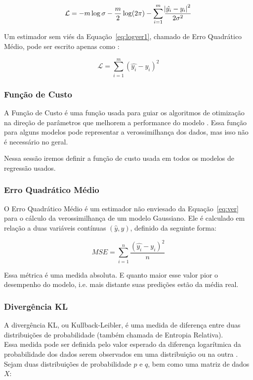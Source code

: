 \begin{equation}
\label{eq:logver1}
  \mathcal{L}= -m \log \sigma - \frac{m}{2} \log (2 \pi) - \sum^m_{i=1}
  \frac{\abs{\hat{y_i}-y_i}^2}{2 \sigma^2}
\end{equation}

Um estimador sem viés da Equação~\ref{eq:logver1}, chamado de Erro Quadrático
Médio, pode ser escrito apenas como \citep{mlprob}:

\begin{equation}
  \label{eq:logver2}
  \mathcal{L}=  \sum^m_{i=1} (\hat{y_i}-y_i)^2
\end{equation}


\subsubsection{Função de Custo}

A Função de Custo é uma função usada para guiar os algoritmos de otimização na
direção de parâmetros que melhorem a performance do modelo \citep{dlbook}.
Essa função para alguns modelos pode representar a verossimilhança dos dados,
mas isso não é necessário no geral.

Nessa sessão iremos definir a função de custo usada em todos os modelos de regressão usados. \\

\subsubsection{Erro Quadrático Médio}
\label{sec:MSE}

O Erro Quadrático Médio é um estimador não enviesado da Equação~\ref{eq:ver}
\citep{dlbook} para o cálculo da verossimilhança de um modelo Gaussiano. Ele é calculado em relação a duas variáveis contínuas
$(\hat{y},y)$, definido da seguinte forma:

\[MSE = \sum^n_{i=1}\frac{(\hat{y_i} - y_i)^2}{n}\]

Essa métrica é uma medida absoluta. E quanto maior esse valor pior o desempenho
do modelo, i.e. mais distante suas predições estão da média real. \\

\subsubsection{Divergência KL}

A divergência KL, ou Kullback-Leibler, é uma medida de diferença entre duas distribuições de probabilidade (também chamada de Entropia Relativa). \\
Essa medida pode ser definida pelo valor esperado da diferença logarítmica da probabilidade dos dados serem observados em uma distribuição ou na outra \citep{dlbook}. \\
Sejam duas distribuições de probabilidade $p$ e $q$, bem como uma matriz de dados $X$: \\

